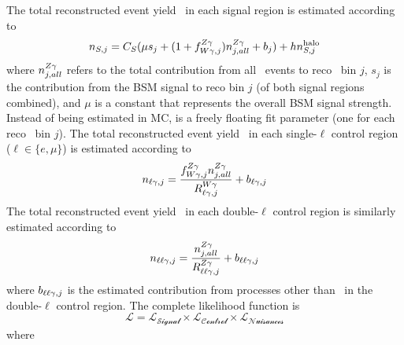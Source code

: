 The total reconstructed event yield \nS\ in each signal region is estimated according to
\begin{equation}
  \nS[,j] = C_{S} (\mu s_{j} + (1 + \fZW[,j])\nZg[j,all] + b_{j}) + h\nhalo[,j]
\end{equation}
where $\nZg[j,all]$ refers to the total contribution from all \zinvg\ events to reco \ETgamma\ bin $j$, $s_{j}$ is the contribution from the BSM
signal to reco bin $j$ (of both signal regions combined), and $\mu$ is a constant that represents the overall BSM signal strength.
Instead of being estimated in MC, \nZg[j,all] is a freely floating fit parameter (one for each reco \ETgamma\ bin $j$).
The total reconstructed event yield \nl\ in each single-$\ell$ control region ($\ell \in \{e,\mu\}$) is estimated according to
\begin{equation}
  \nl[,j] = \frac{\fZW[,j]\nZg[j,all]}{\RWl[,j]} + b_{\ell\Pgamma,j}
\end{equation}
The total reconstructed event yield \nll\ in each double-$\ell$ control region is similarly estimated according to
\begin{equation}
  \nll[,j] = \frac{\nZg[j,all]}{\RZll[,j]} + b_{\ell\ell\Pgamma,j}
\end{equation}
where $b_{\ell\ell\Pgamma,j}$ is the estimated contribution from processes other than \zllg\ in the double-$\ell$ control region.
The complete likelihood function is
\begin{equation}
\mathcal{L} = \mathcal{L_{\text{Signal}}} \times \mathcal{L_{\text{Control}}} \times \mathcal{L_{\text{Nuisances}}}
\end{equation}
where

